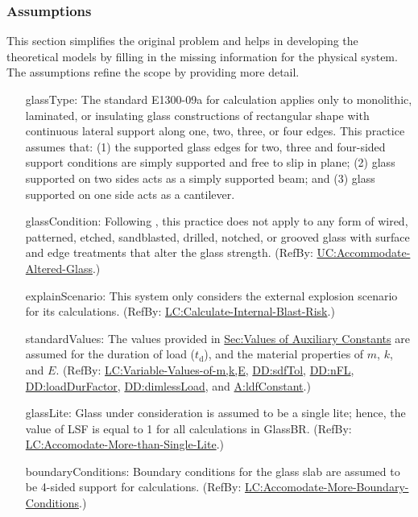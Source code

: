 \documentclass[12pt]{article}
\begin{document}
\subsubsection{Assumptions}
\label{Sec:Assumps}
This section simplifies the original problem and helps in developing the theoretical models by filling in the missing information for the physical system. The assumptions refine the scope by providing more detail.

\begin{itemize}
\item[glassType:\phantomsection\label{assumpGT}]{The standard E1300-09a for calculation applies only to monolithic, laminated, or insulating glass constructions of rectangular shape with continuous lateral support along one, two, three, or four edges. This practice assumes that: (1) the supported glass edges for two, three and four-sided support conditions are simply supported and free to slip in plane; (2) glass supported on two sides acts as a simply supported beam; and (3) glass supported on one side acts as a cantilever.}
\item[glassCondition:\phantomsection\label{assumpGC}]{Following \cite[(pg. 1)]{astm2009}, this practice does not apply to any form of wired, patterned, etched, sandblasted, drilled, notched, or grooved glass with surface and edge treatments that alter the glass strength. (RefBy: \hyperref[accAlteredGlass]{UC:Accommodate-Altered-Glass}.)}
\item[explainScenario:\phantomsection\label{assumpES}]{This system only considers the external explosion scenario for its calculations. (RefBy: \hyperref[calcInternalBlastRisk]{LC:Calculate-Internal-Blast-Risk}.)}
\item[standardValues:\phantomsection\label{assumpSV}]{The values provided in \hyperref[Sec:AuxConstants]{Sec:Values of Auxiliary Constants} are assumed for the duration of load (${t_{\text{d}}}$), and the material properties of $m$, $k$, and $E$. (RefBy: \hyperref[varValsOfmkE]{LC:Variable-Values-of-m,k,E}, \hyperref[DD:sdfTol]{DD:sdfTol}, \hyperref[DD:nFL]{DD:nFL}, \hyperref[DD:loadDurFactor]{DD:loadDurFactor}, \hyperref[DD:dimlessLoad]{DD:dimlessLoad}, and \hyperref[assumpLDFC]{A:ldfConstant}.)}
\item[glassLite:\phantomsection\label{assumpGL}]{Glass under consideration is assumed to be a single lite; hence, the value of LSF is equal to 1 for all calculations in GlassBR. (RefBy: \hyperref[accMoreThanSingleLite]{LC:Accomodate-More-than-Single-Lite}.)}
\item[boundaryConditions:\phantomsection\label{assumpBC}]{Boundary conditions for the glass slab are assumed to be 4-sided support for calculations. (RefBy: \hyperref[accMoreBoundaryConditions]{LC:Accomodate-More-Boundary-Conditions}.)}

\end{itemize}
\end{document}
